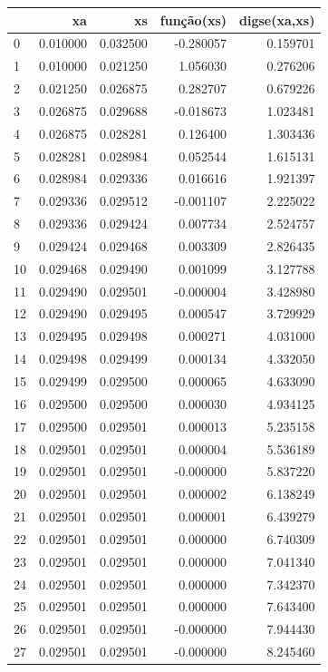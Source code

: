 \begin{tabular}{lrrrr}
\toprule
 & xa & xs & função(xs) & digse(xa,xs) \\
\midrule
0 & 0.010000 & 0.032500 & -0.280057 & 0.159701 \\
1 & 0.010000 & 0.021250 & 1.056030 & 0.276206 \\
2 & 0.021250 & 0.026875 & 0.282707 & 0.679226 \\
3 & 0.026875 & 0.029688 & -0.018673 & 1.023481 \\
4 & 0.026875 & 0.028281 & 0.126400 & 1.303436 \\
5 & 0.028281 & 0.028984 & 0.052544 & 1.615131 \\
6 & 0.028984 & 0.029336 & 0.016616 & 1.921397 \\
7 & 0.029336 & 0.029512 & -0.001107 & 2.225022 \\
8 & 0.029336 & 0.029424 & 0.007734 & 2.524757 \\
9 & 0.029424 & 0.029468 & 0.003309 & 2.826435 \\
10 & 0.029468 & 0.029490 & 0.001099 & 3.127788 \\
11 & 0.029490 & 0.029501 & -0.000004 & 3.428980 \\
12 & 0.029490 & 0.029495 & 0.000547 & 3.729929 \\
13 & 0.029495 & 0.029498 & 0.000271 & 4.031000 \\
14 & 0.029498 & 0.029499 & 0.000134 & 4.332050 \\
15 & 0.029499 & 0.029500 & 0.000065 & 4.633090 \\
16 & 0.029500 & 0.029500 & 0.000030 & 4.934125 \\
17 & 0.029500 & 0.029501 & 0.000013 & 5.235158 \\
18 & 0.029501 & 0.029501 & 0.000004 & 5.536189 \\
19 & 0.029501 & 0.029501 & -0.000000 & 5.837220 \\
20 & 0.029501 & 0.029501 & 0.000002 & 6.138249 \\
21 & 0.029501 & 0.029501 & 0.000001 & 6.439279 \\
22 & 0.029501 & 0.029501 & 0.000000 & 6.740309 \\
23 & 0.029501 & 0.029501 & 0.000000 & 7.041340 \\
24 & 0.029501 & 0.029501 & 0.000000 & 7.342370 \\
25 & 0.029501 & 0.029501 & 0.000000 & 7.643400 \\
26 & 0.029501 & 0.029501 & -0.000000 & 7.944430 \\
27 & 0.029501 & 0.029501 & -0.000000 & 8.245460 \\
\bottomrule
\end{tabular}
